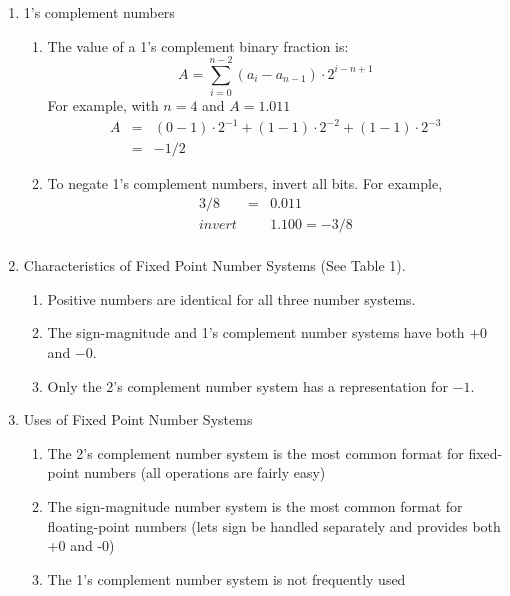 \documentclass[times, twocolumn, 10pt]{article}
\begin{document}
\begin{enumerate}
\item 1's complement numbers
  \begin{enumerate}
  \item The value of a 1's complement binary fraction is:
    \[ A = \sum_{i=0}^{n-2} (a_{i} - a_{n-1}) \cdot 2^{i - n + 1} \]
    For example, with $n = 4$ and $A = 1.011$
    \begin{eqnarray*}
      A  & = & (0 - 1) \cdot 2^{-1} + (1 - 1) \cdot 2^{-2} + (1 - 1) \cdot 2^{-3}\\
      & = & -1/2 
    \end{eqnarray*}
  \item To negate 1's complement numbers, invert all bits. For example, 
    \begin{eqnarray*}
      3/8           & = & 0.011 \\
      invert        &   & 1.100 = -3/8 \\
    \end{eqnarray*}
  \end{enumerate}

\item Characteristics of Fixed Point Number Systems (See Table 1). 
  \begin{enumerate}
  \item Positive numbers are identical for all three number systems. 
  \item The sign-magnitude and 1's complement number systems have both $+0$ and $-0$. 
  \item Only the 2's complement number system has a representation for $-1$. 
  \end{enumerate}

\item Uses of Fixed Point Number Systems
  \begin{enumerate}
  \item The 2's complement number system is the most common format 
    for fixed-point numbers (all operations are fairly easy)
  \item The sign-magnitude number system is the most common format for 
    floating-point numbers (lets sign be handled separately and
    provides both +0 and -0)
  \item The 1's complement number system is not frequently used
  \end{enumerate}


\end{enumerate}
\end{document}
